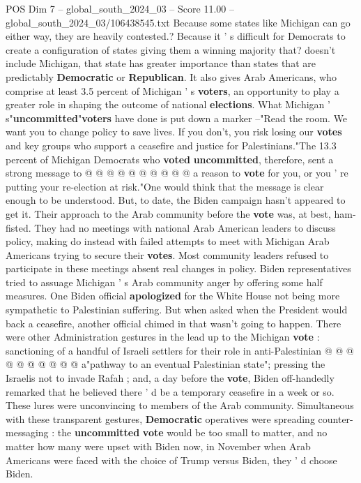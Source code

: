 \begin{textsample}{POS Dim 7 – global\_south\_2024\_03 – Score 11.00 – global\_south\_2024\_03/106438545.txt}
Because some states like Michigan can go either way, they are heavily contested.?
Because it ' s difficult for Democrats to create a configuration of states giving them a winning majority that? doesn't include Michigan, that state has greater importance than states that are predictably \textbf{Democratic} or \textbf{Republican}.
It also gives Arab Americans, who comprise at least 3.5 percent of Michigan ' s \textbf{voters}, an opportunity to play a greater role in shaping the outcome of national \textbf{elections}.
What Michigan ' s"\textbf{uncommitted}"\textbf{voters} have done is put down a marker --"Read the room.
We want you to change policy to save lives.
If you don't, you risk losing our \textbf{votes} and key groups who support a ceasefire and justice for Palestinians."The 13.3 percent of Michigan Democrats who \textbf{voted} \textbf{uncommitted}, therefore, sent a strong message to @ @ @ @ @ @ @ @ @ @ a reason to \textbf{vote} for you, or you ' re putting your re-election at risk."One would think that the message is clear enough to be understood.
But, to date, the Biden campaign hasn't appeared to get it.
Their approach to the Arab community before the \textbf{vote} was, at best, ham-fisted.
They had no meetings with national Arab American leaders to discuss policy, making do instead with failed attempts to meet with Michigan Arab Americans trying to secure their \textbf{votes}.
Most community leaders refused to participate in these meetings absent real changes in policy.
Biden representatives tried to assuage Michigan ' s Arab community anger by offering some half measures.
One Biden official \textbf{apologized} for the White House not being more sympathetic to Palestinian suffering.
But when asked when the President would back a ceasefire, another official chimed in that wasn't going to happen.
There were other Administration gestures in the lead up to the Michigan \textbf{vote} : sanctioning of a handful of Israeli settlers for their role in anti-Palestinian @ @ @ @ @ @ @ @ @ @ a"pathway to an eventual Palestinian state"; pressing the Israelis not to invade Rafah ; and, a day before the \textbf{vote}, Biden off-handedly remarked that he believed there ' d be a temporary ceasefire in a week or so.
These lures were unconvincing to members of the Arab community.
Simultaneous with these transparent gestures, \textbf{Democratic} operatives were spreading counter-messaging : the \textbf{uncommitted} \textbf{vote} would be too small to matter, and no matter how many were upset with Biden now, in November when Arab Americans were faced with the choice of Trump versus Biden, they ' d choose Biden.

\end{textsample}
